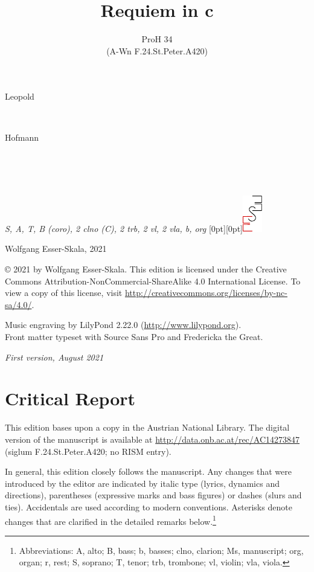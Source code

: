 \documentclass[parskip=full]{scrreprt}
\makeatletter
\DeclareRobustCommand{\sbseries}{\fontseries{sb}\selectfont}
\newcommand\fancytitlehead{
  \headingfont%
  \fontsize{80}{80}\selectfont%
  \textcolor{black!80}{%
    \makebox[0pt][l]{\@ifundefined{@shortname}{\@lastname}{\@shortname}.}%
  }\\[15pt]%
  \fontsize{60}{60}\selectfont%
  \makebox[0pt][l]{\@ifundefined{@shorttitle}{\@title}{\@shorttitle}.}%
}
\def\firstname#1{\def\@firstname{#1}}
\def\lastname#1{\def\@lastname{#1}}
\def\shorttitle#1{\def\@shorttitle{#1}}
\def\scoring#1{\def\@scoring{#1}}
\def\maketitle{%
\begin{titlepage}%
  \Large%
  {\@titlehead}%
  \vfill%
  {\strut\@firstname}\\%
  {\sbseries\color{oldred}\strut\@lastname}\\%
  {\strut\@namesuffix}%
  \vfill%
  {\sbseries\@title}\\%
  {\@subtitle}\\[\baselineskip]%
  {\itshape\@scoring}%
  \vfill%
  {\itshape\@parts}\hspace*{\fill}\raisebox{0pt}[0pt][0pt]{\includegraphics{ees_logo}}%
\end{titlepage}%
}
\newif\ifprintreport\printreportfalse
\makeatother
\begin{document}
\frenchspacing

\titlehead{\fancytitlehead}
\firstname{Leopold}
\lastname{Hofmann}
\title{Requiem in c}
\shorttitle{Requiem}
\subtitle{ProH 34\\(A-Wn F.24.St.Peter.A420)}
\scoring{S, A, T, B (coro), 2 clno (C), 2 trb, 2 vl, 2 vla, b, org}
\maketitle


\thispagestyle{empty}

\vspace*{\fill}

\hspace*{1em}Wolfgang Esser-Skala, 2021

© 2021 by Wolfgang Esser-Skala. This edition is licensed under the Creative Commons Attribution-NonCommercial-ShareAlike 4.0 International License. To view a copy of this license, visit \url{http://creativecommons.org/licenses/by-nc-sa/4.0/}.

Music engraving by LilyPond 2.22.0 (\url{http://www.lilypond.org}).\\
Front matter typeset with Source Sans Pro and Fredericka the Great.

\textit{First version, August 2021}

\vspace*{2cm}

\ifprintreport
\chapter*{Critical Report}

This edition bases upon a copy in the Austrian National Library. The digital version of the manuscript is available at \url{http://data.onb.ac.at/rec/AC14273847} (siglum F.24.St.Peter.A420; no RISM entry).

In general, this edition closely follows the manuscript. Any changes that were introduced by the editor are indicated by italic type (lyrics, dynamics and directions), parentheses (expressive marks and bass figures) or dashes (slurs and ties). Accidentals are used according to modern conventions. Asterisks denote changes that are clarified in the detailed remarks below.\footnote{Abbreviations: A, alto; B, bass; b, basses; clno, clarion; Ms, manuscript; org, organ; r, rest; S, soprano; T, tenor; trb, trombone; vl, violin; vla, viola.}
\end{document}
